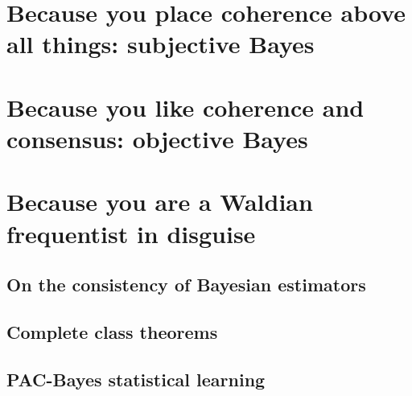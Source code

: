 \section{Because you place coherence above all things: subjective Bayes}

\section{Because you like coherence and consensus: objective Bayes}

\section{Because you are a Waldian frequentist in disguise}

\subsection{On the consistency of Bayesian estimators}

\subsection{Complete class theorems}

\subsection{PAC-Bayes statistical learning}



